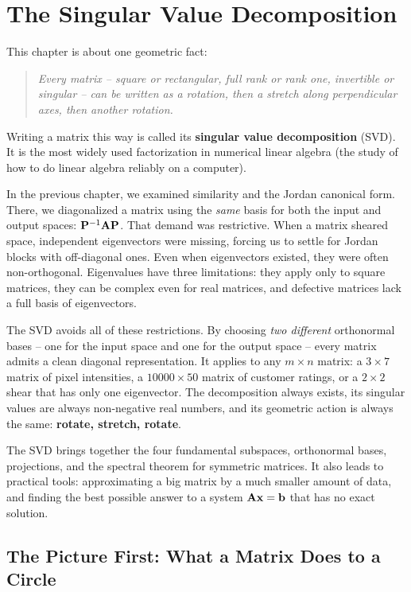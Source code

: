 \chapter{The Singular Value Decomposition}

This chapter is about one geometric fact:

\begin{quote}
\emph{Every matrix -- square or rectangular, full rank or
rank one, invertible or singular -- can be written as a rotation,
then a stretch along perpendicular axes, then another rotation.}
\end{quote}

Writing a matrix this way is called its \textbf{singular value decomposition}
(SVD). It is the most widely used factorization in numerical linear algebra
(the study of how to do linear algebra reliably on a computer).

In the previous chapter, we examined similarity and the Jordan canonical
form. There, we diagonalized a matrix using the \emph{same} basis for
both the input and output spaces: $\mathbf{P}^{-1}\mathbf{A}\mathbf{P}$. That demand was
restrictive. When a matrix sheared space, independent eigenvectors were missing,
forcing us to settle for Jordan blocks with off-diagonal ones. Even when
eigenvectors existed, they were often non-orthogonal.
Eigenvalues have three limitations: they apply only to square matrices,
they can be complex even for real matrices, and defective matrices lack a full basis of eigenvectors.

The SVD avoids all of these restrictions. By choosing \emph{two different} orthonormal bases -- one for the input
space and one for the output space -- every matrix admits a clean diagonal representation.
It applies to any $m\times n$ matrix: a $3\times 7$ matrix of pixel intensities, a
$10000 \times 50$ matrix of customer ratings, or a $2 \times 2$
shear that has only one eigenvector. The decomposition always exists, its singular values are always
non-negative real numbers, and its geometric action is always the same: \textbf{rotate, stretch,
rotate}.

The SVD brings together the four fundamental subspaces, orthonormal bases,
projections, and the spectral theorem for symmetric matrices. It also leads to
practical tools: approximating a big matrix by a much smaller amount of data,
and finding the best possible answer to a system $\mathbf{A}\mathbf{x} = \mathbf{b}$
that has no exact solution.

\section{The Picture First: What a Matrix Does to a Circle}
\label{ch29:circle-picture}

